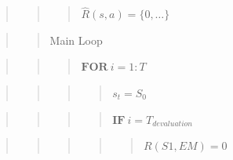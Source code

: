 \documentclass[10pt,a4paper,onecolumn]{article}
\begin{document}
\begin{quote}
\begin{quote}
\begin{quote}
\(\hat{R}(s,a) = \{0,\ldots\}\)
\end{quote}
\end{quote}
\end{quote}

\begin{quote}
\begin{quote}
Main Loop
\end{quote}
\end{quote}

\begin{quote}
\begin{quote}
\begin{quote}
\(\textbf{FOR}\ i = 1:T\)
\end{quote}
\end{quote}
\end{quote}

\begin{quote}
\begin{quote}
\begin{quote}
\begin{quote}
\(s_t = S_0\)
\end{quote}
\end{quote}
\end{quote}
\end{quote}

\begin{quote}
\begin{quote}
\begin{quote}
\begin{quote}
\(\textbf{IF}\ i = T_{devaluation}\)
\end{quote}
\end{quote}
\end{quote}
\end{quote}

\begin{quote}
\begin{quote}
\begin{quote}
\begin{quote}
\begin{quote}
\(R(S1, EM) = 0\)
\end{quote}
\end{quote}
\end{quote}
\end{quote}
\end{quote}
\end{document}
